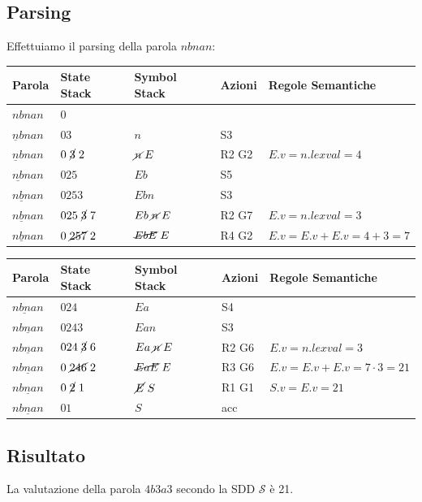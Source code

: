 \documentclass[11pt]{article}
\begin{document}
\subsection{Parsing}
Effettuiamo il parsing della parola $nbnan$:
\begin{table}[H]
  \begin{tabular}{lllll}
    \textbf{Parola} & \textbf{State Stack} & \textbf{Symbol Stack} & \textbf{Azioni} & \textbf{Regole Semantiche}\\
    \hline
    $nbnan$ & 0 &  \\
    $\underline n bnan$ & $03$ & $n$ & S3 & \\
    $\underline n bnan$ & $0\mathrel{\cancel 3}2$ & $\mathrel{\cancel  n} E$ & R2 G2 & $E.v = n.{lexval} = 4$\\
    $\underline {nb} nan$ & $025$ & $Eb$ & S5 & \\
    $\underline {nbn} an$ & $0253$ & $Ebn$ & S3 & \\
    $\underline {nbn} an$ & $025\mathrel{\cancel 3}7$ & $Eb\mathrel{\cancel  n}E$ & R2 G7 & $E.v = n.{lexval} = 3$\\
    $\underline {nbn} an$ & $0\mathrel{\cancel{257}}2$ & $\mathrel{\cancel{EbE}}E$ & R4 G2 & $E.v = E.v + E.v = 4 + 3 = 7$ \\
  \end{tabular}
\label{tab:03-parsing-a}
\end{table}
\begin{table}[H]
  \begin{tabular}{lllll}
    \textbf{Parola} & \textbf{State Stack} & \textbf{Symbol Stack} & \textbf{Azioni} & \textbf{Regole Semantiche}\\
    \hline
    $\underline {nbna} n$ & $024$ & $Ea$ & S4 & \\
    $\underline {nbnan} $ & $0243$ & $Ean$ & S3 & \\
    $\underline {nbnan} $ & $024\mathrel{\cancel 3} 6$ & $Ea\mathrel{\cancel  n} E$ & R2 G6 & $E.v = n.{lexval} = 3$ \\
    $\underline {nbnan} $ & $0\mathrel{\cancel{246}} 2$ & $\mathrel{\cancel{EaE}}E$ & R3 G6 & $E.v = E.v + E.v = 7 \cdot 3 = 21$ \\
    $\underline {nbnan} $ & $0\mathrel{\cancel 2}1$ & $\mathrel{\cancel E}S$ & R1 G1 & $S.v = E.v = 21$ \\
    $\underline {nbnan} $ & $01$ & $S$ & acc &  \\
  \end{tabular}
\label{tab:03-parsing-b}
\end{table}
\subsection{Risultato}
La valutazione della parola $4b3a3$ secondo la SDD $\mathcal S$ è 21.
\end{document}
